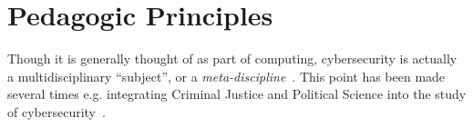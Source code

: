 \documentclass[conference]{IEEEtran}
\begin{document}

\section{Pedagogic Principles}

Though it is generally thought of as part of computing, cybersecurity
is actually a multidisciplinary ``subject'', or a
\emph{meta-discipline}~\cite{Parrishetal2018a}. This point has been
made several times e.g. integrating Criminal Justice and Political Science into the study of cybersecurity~\cite{Stockman2013}.  
\end{document}
